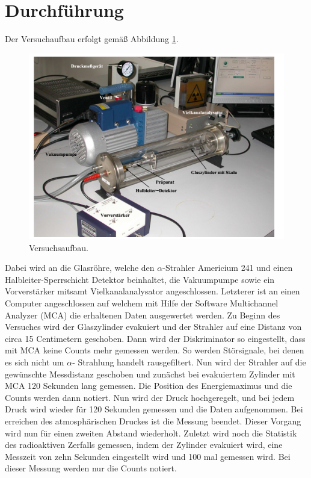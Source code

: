 \section{Durchführung}
\label{sec:Durchführung}
Der Versuchaufbau erfolgt gemäß Abbildung \ref{fig:aufbau}.
\begin{figure}
  \centering
  \includegraphics{images/aufbau.png}
  \caption{Versuchsaufbau. \cite{1}}
  \label{fig:aufbau}
\end{figure}
Dabei wird an die Glasröhre, welche den $\alpha$-Strahler Americium 241 und einen Halbleiter-Sperrschicht Detektor beinhaltet, die Vakuumpumpe sowie ein Vorverstärker mitsamt Vielkanalanalysator angeschlossen.
Letzterer ist an einen Computer angeschlossen auf welchem mit Hilfe der Software Multichannel Analyzer (MCA) die erhaltenen Daten ausgewertet werden.
Zu Beginn des Versuches wird der Glaszylinder evakuiert und der Strahler auf eine Distanz von circa 15 Centimetern geschoben.
Dann wird der Diskriminator so eingestellt, dass mit MCA keine Counts mehr gemessen werden. So werden Störsignale, bei denen es sich nicht um $\alpha$- Strahlung handelt
rausgefiltert. Nun wird der Strahler auf die gewünschte Messdistanz geschoben und zunächst bei evakuiertem Zylinder mit MCA 120 Sekunden lang gemessen. Die Position des
Energiemaximus und die Counts werden dann notiert. Nun wird der Druck hochgeregelt, und bei jedem Druck wird wieder für 120 Sekunden gemessen und die Daten aufgenommen.
Bei erreichen des atmosphärischen Druckes ist die Messung beendet. Dieser Vorgang wird nun für einen zweiten Abstand wiederholt.
Zuletzt wird noch die Statistik des radioaktiven Zerfalls gemessen, indem der Zylinder evakuiert wird, eine Messzeit von zehn Sekunden eingestellt wird und 100 mal gemessen wird.
Bei dieser Messung werden nur die Counts notiert.
